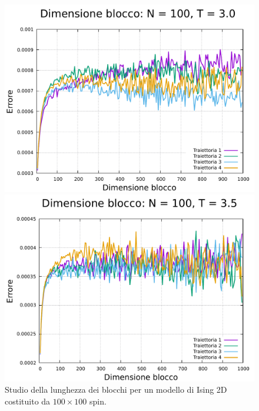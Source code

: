 \begin{figure}[htbp]
    \begin{minipage}{0.45\textwidth}  
      \centering
      \includegraphics[page=1, width=\textwidth]{Immagini/simIsing2D/metro/lblk/err_100_3.0.pdf}
      \caption{$T\,=\,3.0$}
    \end{minipage}\hfill
    \begin{minipage}{0.45\textwidth}  
      \centering
      \includegraphics[page=1, width=\textwidth]{Immagini/simIsing2D/metro/lblk/err_100_3.5.pdf}
      \caption{$T\,=\,3.5$}
    \end{minipage}
    \caption{Studio della lunghezza dei blocchi per un modello di Ising 2D costituito da $100 \times 100$ spin.}
\end{figure}

